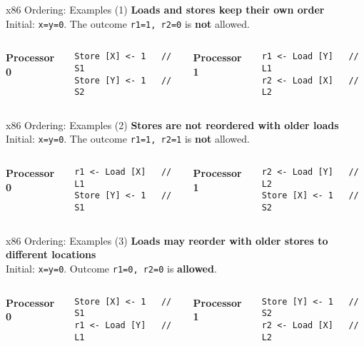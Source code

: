 \documentclass[aspectratio=169,12pt]{beamer}
\begin{document}
\begin{frame}[fragile]{x86 Ordering: Examples (1)}
\textbf{Loads and stores keep their own order}\\[3pt]
Initial: \texttt{x=y=0}. The outcome \texttt{r1=1, r2=0} is \textbf{not} allowed.
\begin{columns}[T]
\textbf{Processor 0}
\begin{lstlisting}[basicstyle=\ttfamily\small]
Store [X] <- 1   // S1
Store [Y] <- 1   // S2
\end{lstlisting}
\textbf{Processor 1}
\begin{lstlisting}[basicstyle=\ttfamily\small]
r1 <- Load [Y]   // L1
r2 <- Load [X]   // L2
\end{lstlisting}
\end{columns}
\end{frame}

\begin{frame}[fragile]{x86 Ordering: Examples (2)}
\textbf{Stores are not reordered with older loads}\\[3pt]
Initial: \texttt{x=y=0}. The outcome \texttt{r1=1, r2=1} is \textbf{not} allowed.
\begin{columns}[T]
\textbf{Processor 0}
\begin{lstlisting}[basicstyle=\ttfamily\small]
r1 <- Load [X]   // L1
Store [Y] <- 1   // S1
\end{lstlisting}
\textbf{Processor 1}
\begin{lstlisting}[basicstyle=\ttfamily\small]
r2 <- Load [Y]   // L2
Store [X] <- 1   // S2
\end{lstlisting}
\end{columns}
\end{frame}

\begin{frame}[fragile]{x86 Ordering: Examples (3)}
\textbf{Loads may reorder with older stores to different locations}\\[3pt]
Initial: \texttt{x=y=0}. Outcome \texttt{r1=0, r2=0} is \textbf{allowed}.
\begin{columns}[T]
\textbf{Processor 0}
\begin{lstlisting}[basicstyle=\ttfamily\small]
Store [X] <- 1   // S1
r1 <- Load [Y]   // L1
\end{lstlisting}
\textbf{Processor 1}
\begin{lstlisting}[basicstyle=\ttfamily\small]
Store [Y] <- 1   // S2
r2 <- Load [X]   // L2
\end{lstlisting}
\end{columns}
\end{frame}
\end{document}

